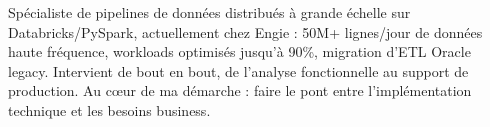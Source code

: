 \documentclass[french]{plushcv}
\begin{document}

\small{
}

\vspace{16pt}

Spécialiste de pipelines de données distribués à grande échelle sur Databricks/PySpark, actuellement chez Engie : 50M+ lignes/jour de données haute fréquence, workloads optimisés jusqu'à 90\%, migration d'ETL Oracle legacy. Intervient de bout en bout, de l'analyse fonctionnelle au support de production. Au cœur de ma démarche : faire le pont entre l'implémentation technique et les besoins business.

\vspace{-6pt}
\end{document}
